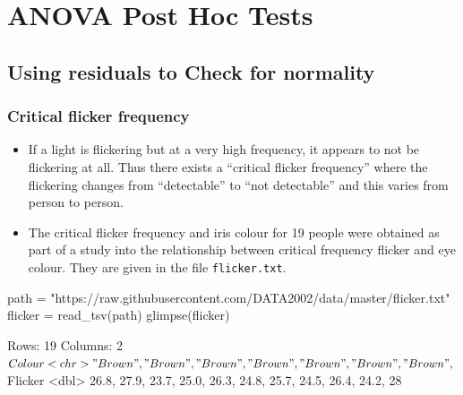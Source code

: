 \documentclass[a4paper]{article}\usepackage[]{graphicx}\usepackage[]{xcolor}
\begin{document}
\section{ANOVA Post Hoc Tests}\label{sec:22}
\subsection{Using residuals to Check for normality}
\subsubsection{Critical flicker frequency}
\begin{itemize}
	\item If a light is flickering but at a very high frequency, it appears to not be flickering at all. Thus there exists a ``critical flicker frequency'' where the flickering changes from ``detectable'' to ``not detectable'' and this varies from person to person.
	\item The critical flicker frequency and iris colour for 19 people were obtained as part of a study into the relationship between critical frequency flicker and eye colour. They are given in the file \lstinline|flicker.txt|.
\end{itemize}
\begin{Schunk}
\begin{Sinput}
path = "https://raw.githubusercontent.com/DATA2002/data/master/flicker.txt"
flicker = read_tsv(path)
glimpse(flicker)
\end{Sinput}
\begin{Soutput}
Rows: 19
Columns: 2
$ Colour  <chr> "Brown", "Brown", "Brown", "Brown", "Brown", "Brown", "Brown",~
$ Flicker <dbl> 26.8, 27.9, 23.7, 25.0, 26.3, 24.8, 25.7, 24.5, 26.4, 24.2, 28~
\end{Soutput}
\end{Schunk}
\end{document}
